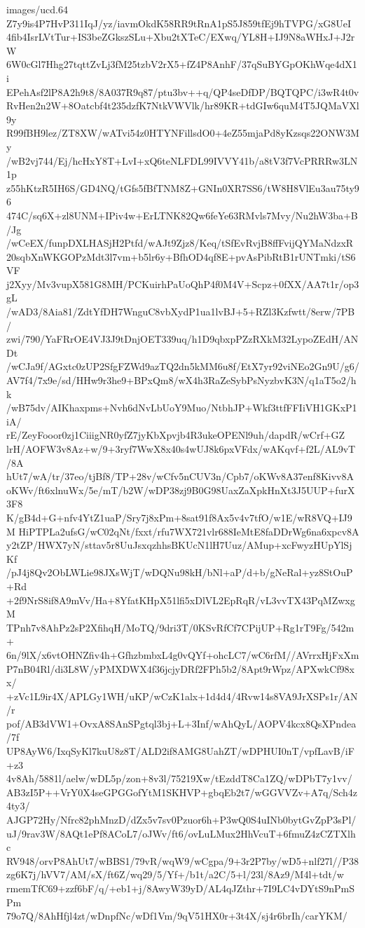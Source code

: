 \begin{filecontents*}{images/ucd.64}
Z7y9is4P7HvP311IqJ/yz/iavmOkdK58RR9tRnA1pS5J859tfEj9hTVPG/xG8UeI
4fib4IsrLVtTur+IS3beZGkszSLu+Xbu2tXTeC/EXwq/YL8H+IJ9N8aWHxJ+J2rW
6W0cGl7Hhg27tqttZvLj3fM25tzbV2rX5+fZ4P8AnhF/37qSuBYGpOKhWqe4dX1i
EPehAsf2lP8A2h9t8/8A037R9q87/ptu3bv++q/QP4seDfDP/BQTQPC/i3wR4t0v
RvHen2n2W+8Oatcbf4t235dzfK7NtkVWVlk/hr89KR+tdGIw6quM4T5JQMaVXl9y
R99fBH9lez/ZT8XW/wATvi54z0HTYNFillsdO0+4eZ55mjaPd8yKzsqs22ONW3My
/wB2vj744/Ej/hcHxY8T+LvI+xQ6teNLFDL99IVVY41b/a8tV3f7VcPRRRw3LN1p
z55hKtzR5IH6S/GD4NQ/tGfs5fBfTNM8Z+GNIn0XR7SS6/tW8H8VlEu3au75ty96
474C/sq6X+zl8UNM+IPiv4w+ErLTNK82Qw6feYe63RMvls7Mvy/Nu2hW3ba+B/Jg
/wCeEX/funpDXLHASjH2Ptfd/wAJt9Zjz8/Keq/tSfEvRvjB8ffFvijQYMaNdzxR
20sqbXnWKGOPzMdt3l7vm+b5lr6y+BfhOD4qf8E+pvAsPibRtB1rUNTmki/tS6VF
j2Xyy/Mv3vupX581G8MH/PCKuirhPaUoQhP4f0M4V+Scpz+0fXX/AA7t1r/op3gL
/wAD3/8Aia81/ZdtYfDH7WnguC8vbXydP1ua1lvBJ+5+RZl3Kzfwtt/8erw/7PB/
zwi/790/YaFRrOE4VJ3J9tDnjOET339uq/h1D9qbxpPZzRXkM32LypoZEdH/ANDt
/wCJa9f/AGxtc0zUP2SfgFZWd9azTQ2dn5kMM6u8f/EtX7yr92viNEo2Gn9U/g6/
AV7f4/7x9e/sd/HHw9r3he9+BPxQm8/wX4h3RaZeSybPsNyzbvK3N/q1aT5o2/hk
/wB75dv/AIKhaxpms+Nvh6dNvLbUoY9Muo/NtbhJP+Wkf3ttfFFIiVH1GKxP1iA/
rE/ZeyFooor0zj1CiiigNR0yfZ7jyKbXpvjb4R3ukeOPENl9uh/dapdR/wCrf+GZ
lrH/AOFW3v8Az+w/9+3ryf7WwX8x40s4wUJ8k6pxVFdx/wAKqvf+f2L/AL9vT/8A
hUt7/wA/tr/37eo/tjBf8/TP+28v/wCfv5nCUV3n/Cpb7/oKWv8A37enf8Kivv8A
oKWv/ft6xlnuWx/5e/mT/b2W/wDP38zj9B0G98UaxZaXpkHnXt3J5UUP+furX3F8
K/gB4d+G+nfv4YtZ1uaP/Sry7j8xPm+8sat91f8Ax5v4v7tfO/w1E/wR8VQ+IJ9M
HiPTPLa2ufsG/wC02qNt/fxxt/rfu7WX721vlr688IeMtE8faDDrWg6na6xpcv8A
y2tZP/HWX7yN/sttav5r8UuJsxqzhhsBKUcN1lH7Uuz/AMup+xcFwyzHUpYlSjKf
/pJ4j8Qv2ObLWLie98JXsWjT/wDQNu98kH/bNl+aP/d+b/gNeRal+yz8StOuP+Rd
+2f9NrS8if8A9mVv/Ha+8YfatKHpX51lfi5xDlVL2EpRqR/vL3vvTX43PqMZwxgM
TPnh7v8AhPz2sP2XfihqH/MoTQ/9dri3T/0KSvRfCf7CPijUP+Rg1rT9Fg/542m+
6n/9lX/x6vtOHNZfiv4h+GfhzbmbxL4g0vQYf+ohcLC7/wC6rfM//AVrrxHjFxXm
P7nB04Rl/di3L8W/yPMXDWX4f36jcjyDRf2FPh5b2/8Apt9rWpz/APXwkCf98xx/
+zVc1L9ir4X/APLGy1WH/uKP/wCzK1alx+1d4d4/4Rvw14s8VA9JrXSPs1r/AN/r
pof/AB3dVW1+OvxA8SAnSPgtql3bj+L+3Inf/wAhQyL/AOPV4kcx8QsXPndea/7f
UP8AyW6/IxqSyKl7kuU8z8T/ALD2if8AMG8UahZT/wDPHUI0nT/vpfLavB/iF+z3
4v8Ah/5881l/aelw/wDL5p/zon+8v3l/75219Xw/tEzddT8Ca1ZQ/wDPbT7y1vv/
AB3zI5P++VrY0X4seGPGGofYtM1SKHVP+gbqEb2t7/wGGVVZv+A7q/Sch4z4ty3/
AJGP72Hy/Nfrc82phMnzD/dZx5v7sv0Pzuor6h+P3wQ0S4uINb0bytGvZpP3sPl/
uJ/9rav3W/8AQt1ePf8ACoL7/oJWv/ft6/ovLuLMux2HhVcuT+6fmuZ4zCZTXlhc
RV948/orvP8AhUt7/wBBS1/79vR/wqW9/wCgpa/9+3r2P7by/wD5+nlf27l//P38
zg6K7j/hVV7/AM/sX/ft6Z/wq29/5/Yf+/b1t/a2C/5+l/23l/8Az9/M4l+tdt/w
rmemTfC69+zzf6bF/q/+eb1+j/8AwyW39yD/AL4qJZthr+7I9LC4vDYtS9nPmSPm
79o7Q/8AhHfjl4zt/wDnpfNc/wDf1Vm/9qV51HX0r+3t4X/sj4r6brIh/carYKM/

\end{filecontents*}
